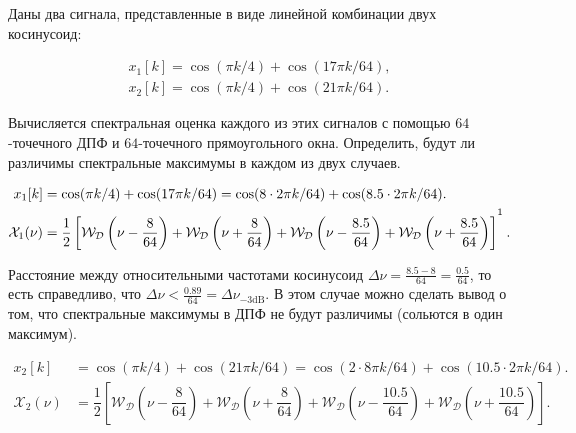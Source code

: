 \protect\thispagestyle{fancy}
\section{}
Даны два сигнала, представленные в виде линейной комбинации двух косинусоид:

\begin{align*}
x_1[k] = \cos( \pi k / 4)  + \cos(17 \pi k / 64),\\
x_2[k] = \cos( \pi k / 4)  + \cos(21 \pi k / 64).
\end{align*}

Вычисляется спектральная оценка каждого из этих сигналов с помощью $64$-точечного ДПФ  и $64$-точечного прямоугольного окна.
Определить, будут ли различимы спектральные максимумы в каждом из двух случаев.

\begin{align*}
x_1[k] &= \cos( \pi k / 4)  + \cos(17 \pi k / 64) = \cos( 8\cdot 2\pi k / 64)  + \cos(8.5 \cdot 2 \pi k / 64).\\
\mathcal{X}_1(\nu) &= \dfrac{1}{2}\left[\mathcal{W}_{\mathcal{D}}\left(\nu-\dfrac{8}{64}\right) +
\mathcal{W}_{\mathcal{D}}\left(\nu+\dfrac{8}{64}\right) +
\mathcal{W}_{\mathcal{D}}\left(\nu-\dfrac{8.5}{64}\right) +
\mathcal{W}_{\mathcal{D}}\left(\nu+\dfrac{8.5}{64}\right)\right]^{\footnotemark}.
\end{align*}

Расстояние между относительными частотами косинусоид $\Delta \nu = \frac{8.5-8}{64} = \frac{0.5}{64}$, то есть справедливо, что $\Delta \nu < \frac{0.89}{64} = \Delta \nu_{-3\text{dB}}$. В этом случае можно сделать вывод о том, что спектральные максимумы в ДПФ не будут различимы (сольются в один максимум).


\begin{align*}
x_2[k] &= \cos( \pi k / 4)  + \cos(21 \pi k / 64) = \cos(2\cdot 8\pi k / 64)  + \cos(10.5 \cdot 2 \pi k / 64).\\
\mathcal{X}_2(\nu) &= \dfrac{1}{2}\left[\mathcal{W}_{\mathcal{D}}\left(\nu-\dfrac{8}{64}\right) +
\mathcal{W}_{\mathcal{D}}\left(\nu+\dfrac{8}{64}\right) +
\mathcal{W}_{\mathcal{D}}\left(\nu-\dfrac{10.5}{64}\right) +
\mathcal{W}_{\mathcal{D}}\left(\nu+\dfrac{10.5}{64}\right)\right].
\end{align*}


